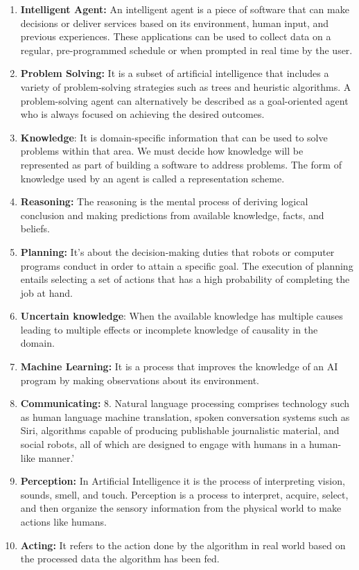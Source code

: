 \documentclass{article}
\begin{document}
	\begin{enumerate}
		\item \textbf{Intelligent Agent: } An intelligent agent is a piece of software that can make decisions or deliver services based on its environment, human input, and previous experiences. These applications can be used to collect data on a regular, pre-programmed schedule or when prompted in real time by the user.
	
		\item \textbf{Problem Solving: }It is a subset of artificial intelligence that includes a variety of problem-solving strategies such as trees and heuristic algorithms. A problem-solving agent can alternatively be described as a goal-oriented agent who is always focused on achieving the desired outcomes.
	
		\item \textbf{Knowledge}: It is domain-specific information that can be used to solve problems within that area. We must decide how knowledge will be represented as part of building a software to address problems. The form of knowledge used by an agent is called a representation scheme.
	
		\item \textbf{Reasoning: }The reasoning is the mental process of deriving logical conclusion and making predictions from available knowledge, facts, and beliefs.
	
		\item \textbf{Planning:} It's about the decision-making duties that robots or computer programs conduct in order to attain a specific goal. The execution of planning entails selecting a set of actions that has a high probability of completing the job at hand.
	
		\item \textbf{Uncertain knowledge}: When the available knowledge has multiple causes leading to multiple effects or incomplete knowledge of causality in the domain.
	
		\item \textbf{Machine Learning: }It is a process that improves the knowledge of an AI program by making observations about its environment.
	
		\item \textbf{Communicating:} 8.	Natural language processing comprises technology such as human language machine translation, spoken conversation systems such as Siri, algorithms capable of producing publishable journalistic material, and social robots, all of which are designed to engage with humans in a human-like manner.'
	
		\item \textbf{Perception:} In Artificial Intelligence it is the process of interpreting vision, sounds, smell, and touch. Perception is a process to interpret, acquire, select, and then organize the sensory information from the physical world to make actions like humans.
	
		\item \textbf{Acting:} It refers to the action done by the algorithm in real world based on the processed data the algorithm has been fed.\end{enumerate}
		
	
\end{document}
